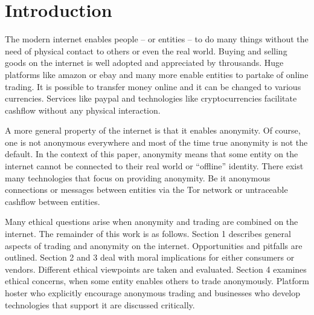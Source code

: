 \section{Introduction}



The modern internet enables people -- or entities -- to do many things without the need of physical contact to others or even the real world. Buying and selling goods on the internet is well adopted and appreciated by throusands. Huge platforms like amazon or ebay and many more enable entities to partake of online trading. It is possible to transfer money online and it can be changed to various currencies. Services like paypal and technologies like cryptocurrencies facilitate cashflow without any physical interaction.

A more general property of the internet is that it enables anonymity. Of course, one is not anonymous everywhere and most of the time true anonymity is not the default. In the context of this paper, anonymity means that some entity on the internet cannot be connected to their real world or ``offline'' identity. There exist many technologies that focus on providing anonymity. Be it anonymous connections or messages between entities via the Tor network or untraceable cashflow between entities.

Many ethical questions arise when anonymity and trading are combined on the internet. The remainder of this work is as follows. Section 1 describes general aspects of trading and anonymity on the internet. Opportunities and pitfalls are outlined. Section 2 and 3 deal with moral implications for either consumers or vendors. Different ethical viewpoints are taken and evaluated. Section 4 examines ethical concerns, when some entity enables others to trade anonymously. Platform hoster who explicitly encourage anonymous trading and businesses who develop technologies that support it are discussed critically.
